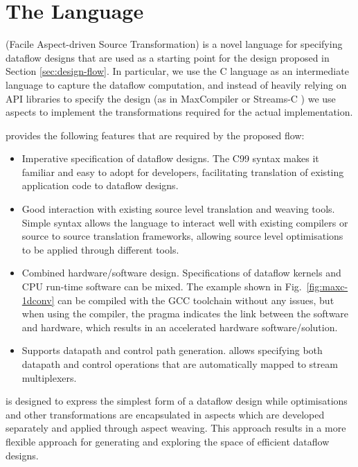 \section{The \MAXC{} Language}
\label{sec:maxc}

\MAXC{} (Facile Aspect-driven Source Transformation) is a novel
language for specifying dataflow designs that are used as a starting
point for the design proposed in Section \ref{sec:design-flow}. In
particular, we use the C language as an intermediate language to
capture the dataflow computation, and instead of heavily relying on
API libraries to specify the design (as in MaxCompiler
\cite{MaxelerTechnologies:2012} or Streams-C
\cite{Gokhale:Stone:Arnold:Kalinowski:2000}) we use aspects to
implement the transformations required for the actual implementation.

\MAXC{} provides the following features that are
required by the proposed flow:

\begin{itemize}
\item Imperative specification of dataflow designs. The C99 syntax
  makes it familiar and easy to adopt for developers, facilitating
  translation of existing application code to dataflow designs.
\item Good interaction with existing source level translation and
  weaving tools. Simple syntax allows the language to interact well
  with existing compilers or source to source translation frameworks,
  allowing source level optimisations to be applied through different
  tools.
\item Combined hardware/software design. Specifications of dataflow
  kernels and CPU run-time software can be mixed. The example shown in
  Fig.~\ref{fig:maxc-1dconv} can be compiled with the GCC toolchain
  without any issues, but when using the \MAXC{} compiler, the pragma
  indicates the link between the software and hardware, which results
  in an accelerated hardware software/solution.
\item Supports datapath and control path generation. \MAXC{} allows
  specifying both datapath and control operations that are
  automatically mapped to stream multiplexers.
\end{itemize}

\MAXC{} is designed to express the simplest form of a dataflow design
while optimisations and other transformations are encapsulated in
aspects which are developed separately and applied through aspect
weaving. This approach results in a more flexible approach for
generating and exploring the space of efficient dataflow designs.

